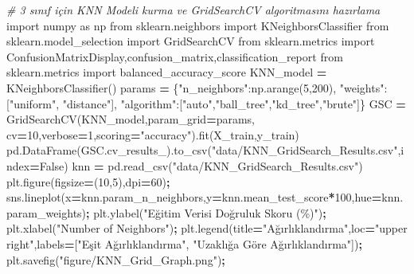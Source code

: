 \documentclass[12pt,twoside]{deuthesis}
\newenvironment{Shaded}{\begin{snugshade}}{\end{snugshade}}
\newcommand{\CommentTok}[1]{\textcolor[rgb]{0.56,0.35,0.01}{\textit{#1}}}
\newcommand{\DecValTok}[1]{\textcolor[rgb]{0.00,0.00,0.81}{#1}}
\newcommand{\ImportTok}[1]{#1}
\newcommand{\NormalTok}[1]{#1}
\newcommand{\OperatorTok}[1]{\textcolor[rgb]{0.81,0.36,0.00}{\textbf{#1}}}
\newcommand{\StringTok}[1]{\textcolor[rgb]{0.31,0.60,0.02}{#1}}
\newcommand{\VariableTok}[1]{\textcolor[rgb]{0.00,0.00,0.00}{#1}}
\begin{document}
\scriptsize
\begin{Shaded}
\begin{Highlighting}[]
\CommentTok{\# 3 sınıf için KNN Modeli kurma ve GridSearchCV algoritmasını hazırlama}
\ImportTok{import}\NormalTok{ numpy }\ImportTok{as}\NormalTok{ np}
\ImportTok{from}\NormalTok{ sklearn.neighbors }\ImportTok{import}\NormalTok{ KNeighborsClassifier}
\ImportTok{from}\NormalTok{ sklearn.model\_selection }\ImportTok{import}\NormalTok{ GridSearchCV}
\ImportTok{from}\NormalTok{ sklearn.metrics }\ImportTok{import}\NormalTok{ ConfusionMatrixDisplay,confusion\_matrix,classification\_report}
\ImportTok{from}\NormalTok{ sklearn.metrics }\ImportTok{import}\NormalTok{ balanced\_accuracy\_score}
\NormalTok{KNN\_model }\OperatorTok{=}\NormalTok{ KNeighborsClassifier()}
\NormalTok{params }\OperatorTok{=}\NormalTok{ \{}\StringTok{"n\_neighbors"}\NormalTok{:np.arange(}\DecValTok{5}\NormalTok{,}\DecValTok{200}\NormalTok{),}
          \StringTok{"weights"}\NormalTok{:[}\StringTok{"uniform"}\NormalTok{, }\StringTok{"distance"}\NormalTok{],}
          \StringTok{"algorithm"}\NormalTok{:[}\StringTok{"auto"}\NormalTok{,}\StringTok{"ball\_tree"}\NormalTok{,}\StringTok{"kd\_tree"}\NormalTok{,}\StringTok{"brute"}\NormalTok{]\}}
\NormalTok{GSC }\OperatorTok{=}\NormalTok{ GridSearchCV(KNN\_model,param\_grid}\OperatorTok{=}\NormalTok{params,}
\NormalTok{                   cv}\OperatorTok{=}\DecValTok{10}\NormalTok{,verbose}\OperatorTok{=}\DecValTok{1}\NormalTok{,scoring}\OperatorTok{=}\StringTok{"accuracy"}\NormalTok{).fit(X\_train,y\_train)}
\NormalTok{pd.DataFrame(GSC.cv\_results\_).to\_csv(}\StringTok{"data/KNN\_GridSearch\_Results.csv"}\NormalTok{,index}\OperatorTok{=}\VariableTok{False}\NormalTok{)}
\NormalTok{knn }\OperatorTok{=}\NormalTok{ pd.read\_csv(}\StringTok{"data/KNN\_GridSearch\_Results.csv"}\NormalTok{)}
\NormalTok{plt.figure(figsize}\OperatorTok{=}\NormalTok{(}\DecValTok{10}\NormalTok{,}\DecValTok{5}\NormalTok{),dpi}\OperatorTok{=}\DecValTok{60}\NormalTok{)}\OperatorTok{;}
\NormalTok{sns.lineplot(x}\OperatorTok{=}\NormalTok{knn.param\_n\_neighbors,y}\OperatorTok{=}\NormalTok{knn.mean\_test\_score}\OperatorTok{*}\DecValTok{100}\NormalTok{,hue}\OperatorTok{=}\NormalTok{knn.param\_weights)}\OperatorTok{;}
\NormalTok{plt.ylabel(}\StringTok{"Eğitim Verisi Doğruluk Skoru (\%)"}\NormalTok{)}\OperatorTok{;}
\NormalTok{plt.xlabel(}\StringTok{"Number of Neighbors"}\NormalTok{)}\OperatorTok{;}
\NormalTok{plt.legend(title}\OperatorTok{=}\StringTok{"Ağırlıklandırma"}\NormalTok{,loc}\OperatorTok{=}\StringTok{"upper right"}\NormalTok{,labels}\OperatorTok{=}\NormalTok{[}\StringTok{"Eşit Ağırlıklandırma"}\NormalTok{,}
\StringTok{"Uzaklığa Göre Ağırlıklandırma"}\NormalTok{])}\OperatorTok{;}
\NormalTok{plt.savefig(}\StringTok{"figure/KNN\_Grid\_Graph.png"}\NormalTok{)}\OperatorTok{;}
\end{Highlighting}
\end{Shaded}
\end{document}
